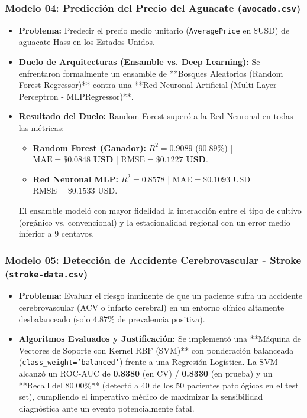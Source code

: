 \documentclass[12pt,letterpaper]{article}
\begin{document}
\subsubsection{Modelo 04: Predicción del Precio del Aguacate (\texttt{avocado.csv})}
\begin{itemize}[leftmargin=*]
    \item \textbf{Problema:} Predecir el precio medio unitario (\texttt{AveragePrice} en \$USD) de aguacate Hass en los Estados Unidos.
    \item \textbf{Duelo de Arquitecturas (Ensamble vs. Deep Learning):} Se enfrentaron formalmente un ensamble de **Bosques Aleatorios (Random Forest Regressor)** contra una **Red Neuronal Artificial (Multi-Layer Perceptron - MLPRegressor)**.
    \item \textbf{Resultado del Duelo:} Random Forest superó a la Red Neuronal en todas las métricas:
    \begin{itemize}
        \item \textbf{Random Forest (Ganador):} $R^2 = \mathbf{0.9089}$ (90.89\%) | $\text{MAE} = \mathbf{\$0.0848\text{ USD}}$ | $\text{RMSE} = \mathbf{\$0.1227\text{ USD}}$.
        \item \textbf{Red Neuronal MLP:} $R^2 = 0.8578$ | $\text{MAE} = \$0.1093\text{ USD}$ | $\text{RMSE} = \$0.1533\text{ USD}$.
    \end{itemize}
    El ensamble modeló con mayor fidelidad la interacción entre el tipo de cultivo (orgánico vs. convencional) y la estacionalidad regional con un error medio inferior a 9 centavos.
\end{itemize}

\subsubsection{Modelo 05: Detección de Accidente Cerebrovascular - Stroke (\texttt{stroke-data.csv})}
\begin{itemize}[leftmargin=*]
    \item \textbf{Problema:} Evaluar el riesgo inminente de que un paciente sufra un accidente cerebrovascular (ACV o infarto cerebral) en un entorno clínico altamente desbalanceado (solo $4.87\%$ de prevalencia positiva).
    \item \textbf{Algoritmos Evaluados y Justificación:} Se implementó una **Máquina de Vectores de Soporte con Kernel RBF (SVM)** con ponderación balanceada (\texttt{class\_weight='balanced'}) frente a una Regresión Logística. La SVM alcanzó un ROC-AUC de \textbf{0.8380} (en CV) / \textbf{0.8330} (en prueba) y un **Recall del 80.00\%** (detectó a 40 de los 50 pacientes patológicos en el test set), cumpliendo el imperativo médico de maximizar la sensibilidad diagnóstica ante un evento potencialmente fatal.
\end{itemize}
\end{document}
